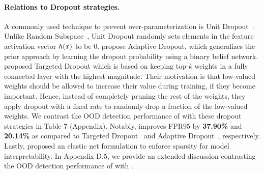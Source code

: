 \paragraph{Relations to Dropout strategies.} A commonly used technique to prevent over-parameterization is Unit Dropout~\cite{hinton2012improving,srivastava2014dropout}. Unlike Random Subspace~\cite{ho1998nearest}, Unit Dropout randomly sets elements in the feature activation vector $h(\*x)$ to be 0. \citet{ba2013adaptive} propose Adaptive Dropout, which generalizes the prior approach by learning the dropout probability using a binary belief network. \citet{gomez2019learning} proposed Targeted Dropout which is based on keeping top-$k$ weights in a fully connected layer with the highest magnitude. Their motivation is that low-valued weights should be allowed to increase their value during training, if they become important. Hence, instead of completely pruning the rest of the weights, they apply dropout with a fixed rate to randomly drop a fraction of the low-valued weights. We contrast the OOD detection performance of \name with these dropout strategies in Table 7 (Appendix). Notably, \name improves FPR95 by \textbf{37.90\%} and \textbf{20.14\%} as compared to Targeted Dropout~\cite{gomez2019learning} and Adaptive Dropout~\cite{ba2013adaptive}, respectively. Lastly, \citet{wong2021leveraging} proposed an elastic net formulation to enforce sparsity for model interpretability. In Appendix D.5, we provide an extended discussion contrasting the OOD detection performance of \name with \cite{wong2021leveraging}.

